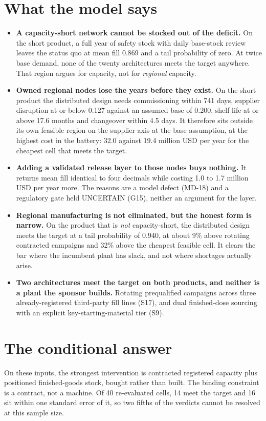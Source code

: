 \documentclass[10pt,letterpaper]{article}
\begin{document}
\section{What the model says}
\begin{itemize}
\item \textbf{A capacity-short network cannot be stocked out of the deficit.} On the short product,
a full year of safety stock with daily base-stock review leaves the status quo at mean fill 0.869
and a tail probability of zero. At twice base demand, none of the twenty architectures meets the
target anywhere. That region argues for capacity, not for \emph{regional} capacity.

\item \textbf{Owned regional nodes lose the years before they exist.} On the short product the
distributed design needs commissioning within 741 days, supplier disruption at or below 0.127
against an assumed base of 0.200, shelf life at or above 17.6 months and changeover within 4.5
days. It therefore sits outside its own feasible region on the supplier axis at the base
assumption, at the highest cost in the battery: 32.0 against 19.4 million USD per year for the
cheapest cell that meets the target.

\item \textbf{Adding a validated release layer to those nodes buys nothing.} It returns mean fill
identical to four decimals while costing 1.0 to 1.7 million USD per year more. The reasons are a
model defect (MD-18) and a regulatory gate held UNCERTAIN (G15), neither an argument for the layer.

\item \textbf{Regional manufacturing is not eliminated, but the honest form is narrow.} On the
product that is \emph{not} capacity-short, the distributed design meets the target at a tail
probability of 0.940, at about 9\% above rotating contracted campaigns and 32\% above the cheapest
feasible cell. It clears the bar where the incumbent plant has slack, and not where shortages
actually arise.

\item \textbf{Two architectures meet the target on both products, and neither is a plant the
sponsor builds.} Rotating prequalified campaigns across three already-registered third-party fill
lines (S17), and dual finished-dose sourcing with an explicit key-starting-material tier (S9).
\end{itemize}

\section{The conditional answer}
On these inputs, the strongest intervention is contracted registered capacity plus positioned
finished-goods stock, bought rather than built. The binding constraint is a contract, not a
machine. Of 40 re-evaluated cells, 14 meet the target and 16 sit within one standard error of it,
so two fifths of the verdicts cannot be resolved at this sample size.
\end{document}
